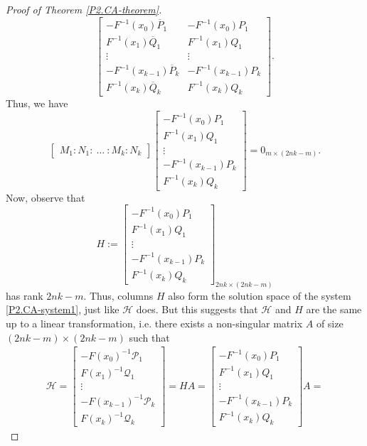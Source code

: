 \documentclass[10pt,reqno,oneside,a4paper]{article}
\begin{document}
\begin{proof}[Proof of Theorem \ref{P2.CA-theorem}]
\[\begin{bmatrix}
-F^{-1}(x_0) \overline{P}_1 & -F^{-1}(x_0) P_1 \\
F^{-1}(x_1)\overline{Q}_1 & F^{-1}(x_1)Q_1  \\
\vdots & \vdots \\
-F^{-1}(x_{k-1})\overline{P}_k & -F^{-1}(x_{k-1})P_k \\
F^{-1}(x_k)\overline{Q}_k & F^{-1}(x_k)Q_k 
\end{bmatrix}. 
\]
Thus, we have 
\[ 
\begin{bmatrix} M_1 : N_1 :~ \ldots ~: M_k : N_k \end{bmatrix}
\begin{bmatrix} 
-F^{-1}(x_0) P_1 \\
F^{-1}(x_1)Q_1  \\
\vdots \\
-F^{-1}(x_{k-1})P_k \\
F^{-1}(x_k)Q_k 
\end{bmatrix} 
= 0_{m \times (2nk-m)}.
\]
Now, observe that 
\[ H := \begin{bmatrix} 
-F^{-1}(x_0) P_1 \\
F^{-1}(x_1)Q_1  \\
\vdots \\
-F^{-1}(x_{k-1})P_k \\
F^{-1}(x_k)Q_k 
\end{bmatrix} _{2nk \times (2nk -m)}
\]
has rank $2nk -m.$ Thus, columns $H$ also form the solution space of the system \eqref{P2.CA-system1}, just like $\mathcal{H}$ does. But this suggests that $\mathcal{H}$ and $H$ are the same up to a linear transformation, i.e. there exists a non-singular matrix $A$ of size $(2nk-m)\times (2nk-m)$ such that
\begin{align*}
\mathcal{H} = 
\begin{bmatrix}
-F(x_{0})^{-1} \mathcal{P}_1 \\
F(x_1)^{-1}\mathcal{Q}_1 \\
\vdots \\
-F(x_{k-1})^{-1} \mathcal{P}_k \\
F(x_k)^{-1}\mathcal{Q}_k 
\end{bmatrix}
= HA = 
\begin{bmatrix} 
-F^{-1}(x_0) P_1 \\
F^{-1}(x_1)Q_1  \\
\vdots \\
-F^{-1}(x_{k-1})P_k \\
F^{-1}(x_k)Q_k 
\end{bmatrix}  
A = 

\end{align*}
\end{proof}
\end{document}
